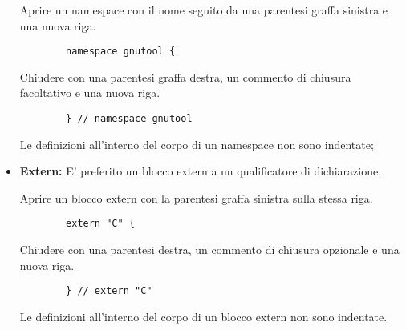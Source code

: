\documentclass[../NomeDocumento.tex]{subfiles}
\begin{document}
\begin{itemize}
		Aprire un namespace con il nome seguito da una parentesi graffa sinistra e una nuova riga.
		
		\begin{verbatim}
		namespace gnutool {
		\end{verbatim}
		
		Chiudere con una parentesi graffa destra, un commento di chiusura facoltativo e una nuova riga.		
		
		\begin{verbatim}
		} // namespace gnutool
		\end{verbatim}
		
		Le definizioni all'interno del corpo di un namespace non sono indentate;
		
		\item \textbf{Extern:} E' preferito un blocco extern a un qualificatore di dichiarazione.
		
		Aprire un blocco extern con la parentesi graffa sinistra sulla stessa riga.
		
		\begin{verbatim}
		extern "C" {
		\end{verbatim}
		
		Chiudere con una parentesi destra, un commento di chiusura opzionale e una nuova riga.
		
		\begin{verbatim}
		} // extern "C"
		\end{verbatim}
		
		Le definizioni all'interno del corpo di un blocco extern non sono indentate.
	
	\end{itemize}
	
\end{document}
